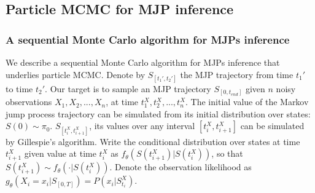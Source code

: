 \subsection{Particle MCMC for MJP inference}
\label{sec:pmcmc}
\subsubsection{A sequential Monte Carlo algorithm for MJPs inference}
We describe a sequential Monte Carlo algorithm for MJPs inference that underlies particle MCMC. Denote by $S_{[t_1', t_2']}$ the MJP trajectory from time $t_1'$ to time $t_2'$. Our target is to sample an MJP trajectory $S_{[0, t_{end}]}$ given $n$ noisy observations $X_1, X_2, ... , X_n$, at time $t_1^X, t_2^X, ..., t_n^X$. 
The initial value of the Markov jump process trajectory can be simulated from its initial distribution over states: $S(0) \sim \pi_0$. 
$S_{[t_i^X, t_{i + 1}^X]} $, its values over any interval $[t_i^X, t_{i+1}^X]$ can be simulated by Gillespie's algorithm. Write the conditional distribution over states at time $t^X_{i+1}$ given value at time $t^X_i$ as $f_\theta(S(t^X_{i+1})|S(t^X_i))$, so that
$S(t_{i + 1}^X) \sim f_\theta (\cdot | S(t_i^X))$.  
Denote the observation likelihood as $g_\theta(X_i = x_i| S_{[0, T]}) = P(x_i | S^X_{t_i})$.



